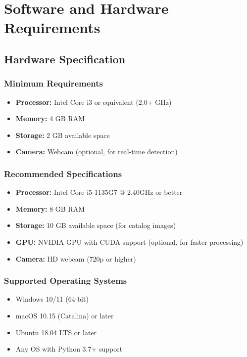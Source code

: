\documentclass[12pt,a4paper]{report}
\begin{document}
\section{Software and Hardware Requirements}

\subsection{Hardware Specification}

\subsubsection{Minimum Requirements}
\begin{itemize}
    \item \textbf{Processor:} Intel Core i3 or equivalent (2.0+ GHz)
    \item \textbf{Memory:} 4 GB RAM
    \item \textbf{Storage:} 2 GB available space
    \item \textbf{Camera:} Webcam (optional, for real-time detection)
\end{itemize}

\subsubsection{Recommended Specifications}
\begin{itemize}
    \item \textbf{Processor:} Intel Core i5-1135G7 @ 2.40GHz or better
    \item \textbf{Memory:} 8 GB RAM
    \item \textbf{Storage:} 10 GB available space (for catalog images)
    \item \textbf{GPU:} NVIDIA GPU with CUDA support (optional, for faster processing)
    \item \textbf{Camera:} HD webcam (720p or higher)
\end{itemize}

\subsubsection{Supported Operating Systems}
\begin{itemize}
    \item Windows 10/11 (64-bit)
    \item macOS 10.15 (Catalina) or later
    \item Ubuntu 18.04 LTS or later
    \item Any OS with Python 3.7+ support
\end{itemize}
\end{document}
